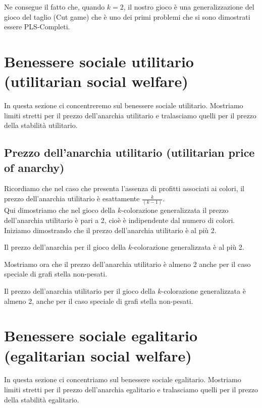 Ne consegue il fatto che, quando \(k = 2\), il nostro gioco è una generalizzazione del gioco del taglio (Cut game) che è uno dei primi problemi che si sono dimostrati essere PLS-Completi.\\

\section{Benessere sociale utilitario (utilitarian social welfare)}
\justify
In questa sezione ci concentreremo sul benessere sociale utilitario. Mostriamo limiti stretti per il prezzo dell'anarchia utilitario e tralasciamo quelli per il prezzo della stabilità utilitario.\\

\subsection{Prezzo dell'anarchia utilitario (utilitarian price of anarchy)}
\justify
Ricordiamo che nel caso che presenta l'assenza di profitti associati ai colori, il prezzo dell'anarchia utilitario è esattamente \(\frac{k}{(k-1)}\).\\

Qui dimostriamo che nel gioco della \(k\)-colorazione generalizzata il prezzo dell'anarchia utilitario è pari a 2, cioè è indipendente dal numero di colori.\\

Iniziamo dimostrando che il prezzo dell'anarchia utilitario è al più 2.\\

\begin{theorem}
\label{theorem1}
	Il prezzo dell'anarchia per il gioco della \(k\)-colorazione generalizzata è al più 2. 
\end{theorem}

Mostriamo ora che il prezzo dell'anarchia utilitario è almeno 2 anche per il caso speciale di grafi stella non-pesati.\\

\begin{theorem}
\label{theorem2}
	Il prezzo dell'anarchia utilitario per il gioco della \(k\)-colorazione generalizzata è almeno 2, anche per il caso speciale di grafi stella non-pesati.
\end{theorem}

\section{Benessere sociale egalitario (egalitarian social welfare)}
\justify
In questa sezione ci concentriamo sul benessere sociale egalitario. Mostriamo limiti stretti per il prezzo dell'anarchia egalitario e tralasciamo quelli per il prezzo della stabilità egalitario.\\

